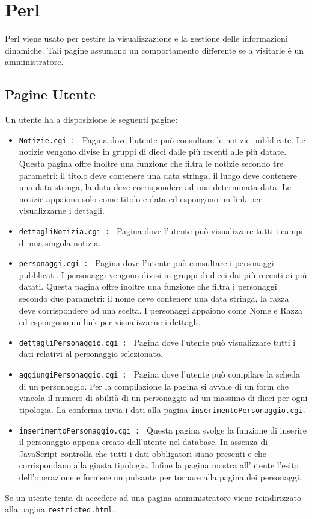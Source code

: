 \documentclass{article}
\begin{document}

\section{Perl}
	Perl viene usato per gestire la visualizzazione e la gestione delle informazioni dinamiche. 
	Tali pagine assumono un comportamento differente se a visitarle è un amministratore.
	\subsection{Pagine Utente}
		Un utente ha a disposizione le seguenti pagine:
		\begin{itemize}
			\item \texttt{Notizie.cgi : } Pagina dove l'utente può consultare le notizie pubblicate.
				Le notizie vengono divise in gruppi di dieci dalle più recenti alle più datate.
				Questa pagina offre inoltre una funzione che filtra le notizie secondo tre parametri:
				il titolo deve contenere una data stringa,
				il luogo deve contenere una data stringa,
				la data deve corrispondere ad una determinata data.
				Le notizie appaiono solo come titolo e data ed espongono un link per visualizzarne i dettagli.
				
			\item \texttt{dettagliNotizia.cgi : } Pagina dove l'utente può visualizzare tutti i campi di una singola notizia.
			\item \texttt{personaggi.cgi : } Pagina dove l'utente può consultare i personaggi pubblicati.
				I personaggi vengono divisi in gruppi di dieci dai più recenti ai più datati.
				Questa pagina offre inoltre una funzione che filtra i personaggi secondo due parametri:
				il nome deve contenere una data stringa,
				la razza deve corrispondere ad una scelta.
				I personaggi appaiono come Nome e Razza ed espongono un link per visualizzarne i dettagli. 
			\item \texttt{dettagliPersonaggio.cgi : } Pagina dove l'utente può visualizzare tutti i dati relativi al personaggio selezionato.
			\item \texttt{aggiungiPersonaggio.cgi : } Pagina dove l'utente può compilare la scheda di un personaggio.
				Per la compilazione la pagina si avvale di un form che vincola il numero di abilità di un personaggio ad un
				massimo di dieci per ogni tipologia. La conferma invia i dati alla pagina \texttt{inserimentoPersonaggio.cgi}.
			\item \texttt{inserimentoPersonaggio.cgi : } Questa pagina svolge la funzione di inserire il personaggio appena
				creato dall'utente nel database. In assenza di JavaScript controlla che tutti i dati obbligatori siano presenti 
				e che corrispondano alla giusta tipologia. Infine la pagina mostra all'utente l'esito dell'operazione e fornisce 
				un pulsante per tornare alla pagina dei personaggi.
		\end{itemize}
		Se un utente tenta di accedere ad una pagina amministratore viene reindirizzato alla pagina \texttt{restricted.html}.
\end{document}
